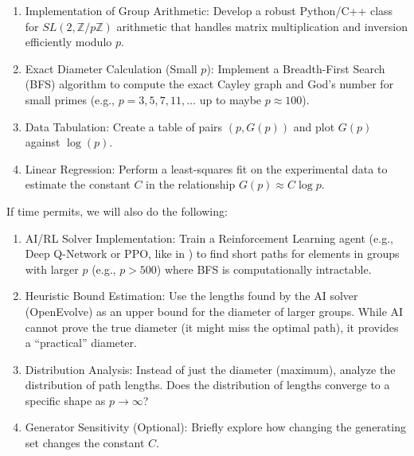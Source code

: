 \documentclass{article}
\begin{document}
\begin{enumerate}
    \item Implementation of Group Arithmetic: Develop a robust Python/C++ class for $SL(2, \mathbb{Z}/p\mathbb{Z})$ arithmetic that handles matrix multiplication and inversion efficiently modulo $p$.
    \item Exact Diameter Calculation (Small $p$): Implement a Breadth-First Search (BFS) algorithm to compute the exact Cayley graph and God's number for small primes (e.g., $p = 3, 5, 7, 11, \dots$ up to maybe $p \approx 100$).
    \item Data Tabulation: Create a table of pairs $(p, G(p))$ and plot $G(p)$ against $\log(p)$.
    \item Linear Regression: Perform a least-squares fit on the experimental data to estimate the constant $C$ in the relationship $G(p) \approx C \log p$.
\end{enumerate}
If time permits, we will also do the following:
\begin{enumerate}
    \item AI/RL Solver Implementation: Train a Reinforcement Learning agent (e.g., Deep Q-Network or PPO, like in \cite{chervov2025cayleypyrlpathfindingreinforcement}) to find short paths for elements in groups with larger $p$ (e.g., $p > 500$) where BFS is computationally intractable.
    \item Heuristic Bound Estimation: Use the lengths found by the AI solver (OpenEvolve) as an upper bound for the diameter of larger groups. While AI cannot prove the true diameter (it might miss the optimal path), it provides a ``practical'' diameter.
    \item Distribution Analysis: Instead of just the diameter (maximum), analyze the distribution of path lengths. Does the distribution of lengths converge to a specific shape as $p \to \infty$?
    \item Generator Sensitivity (Optional): Briefly explore how changing the generating set changes the constant $C$.
\end{enumerate}




\end{document}

